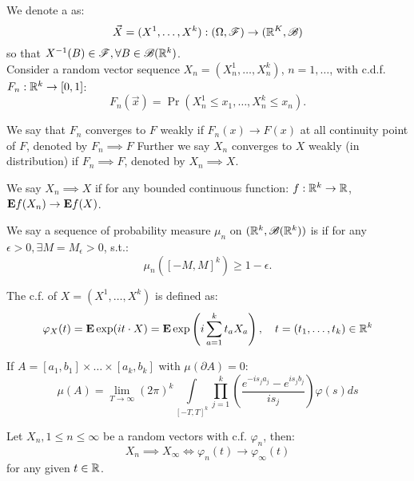 \documentclass[../main/main.tex]{subfiles}
\begin{document}
We denote a  as: \[
	\vec{X} = (X^{1}, \ldots , X^{k}): (\Omega, \mathscr{F}) \to (\mathbb{R}^{K}, \mathscr{B})
\] so that $X^{-1}(B)  \in \mathscr{F}, \forall B \in \mathscr{B}(\mathbb{R}^{k})$.\\

Consider a random vector sequence $X_n = (X_n^{1}, \ldots , X_n^{k})$, $n=1, \ldots$, with c.d.f. $F_n:\mathbb{R}^{k}\to [0,1]$: \[
	F_n(\vec{x}) = \Pr(X_n^{1}\leq x_1, \ldots , X_n^{k}\leq x_n).
\]

\begin{definition}
	We say that $F_n$ converges to $F$ weakly if $F_n(x) \to F(x)$ at all continuity point of $F$, denoted by $F_n \implies F$ Further we say $X_n$ converges to $X$ weakly (in distribution) if $F_n \implies F$, denoted by $X_n \implies X$.
\end{definition}

\begin{definition}
	We say $X_n \implies X$ if for any bounded continuous function: $f: \mathbb{R}^{k} \to \mathbb{R}$, $\text{\textbf{E}} f(X_n) \to \text{\textbf{E}} f(X)$.
\end{definition}

\begin{definition}[tightness]
	We say a sequence of probability measure $\mu_n$ on $(\mathbb{R}^{k}, \mathscr{B}(\mathbb{R}^{k}))$ is  if for any $\epsilon > 0, \exists M = M_{\epsilon} > 0$, s.t.: \[
		\mu_n([-M,M]^{k}) \geq 1- \epsilon.
	\]
\end{definition}
\begin{definition}
	The c.f. of $X = (X^{1}, \ldots , X^{k})$ is defined as: \[
		\varphi_X(t) = \text{\textbf{E}} \exp(it \cdot X) = \text{\textbf{E}} \exp \left( i \sum\limits_{a=1}^{k} t_a X_a \right), \quad t = (t_1, \ldots , t_k) \in \mathbb{R}^{k}
	\]
\end{definition}

\begin{theorem}
	If $A = [a_1,b_1] \times \ldots \times [a_k, b_k]$ with $\mu(\partial A) = 0$: \[
		\mu(A) = \lim\limits_{T\to\infty} (2 \pi)^{k} \int\limits_{[-T,T]^{k}} \prod\limits_{j=1}^{k} \left( \frac{e^{-is_j a_j} - e^{is_jb_j}}{is_j} \right)\varphi(s) ds
	\]
\end{theorem}

\begin{theorem}
	Let $X_n, 1 \leq n \leq \infty$ be a random vectors with c.f. $\varphi_n$, then: \[
		X_n \implies X_{\infty} \iff \varphi_n(t) \to \varphi_{\infty}(t)
	\] for any given $t \in \mathbb{R}$.
\end{theorem}
\end{document}
